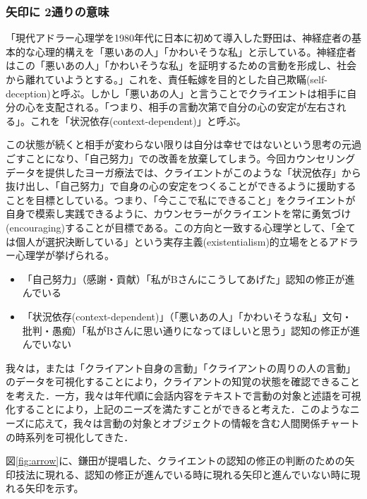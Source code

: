 \documentclass[shuuron]{kuee}
\begin{document}
\subsubsection{矢印に
2通りの意味
}


 「現代アドラー心理学を1980年代に日本に初めて導入した野田\cite{zokad}は、神経症者の基本的な心理的構えを「悪いあの人」「かわいそうな私」と示している。神経症者はこの「悪いあの人」「かわいそうな私」を証明するための言動を形成し、社会から離れていようとする。」これを、責任転嫁を目的とした自己欺瞞(self-deception)と呼ぶ\cite{Darshana}。しかし「悪いあの人」と言うことでクライエントは相手に自分の心を支配される。「つまり、相手の言動次第で自分の心の安定が左右される」。これを「状況依存(context-dependent)」と呼ぶ。

 この状態が続くと相手が変わらない限りは自分は幸せではないという思考の元過ごすことになり、「自己努力」での改善を放棄してしまう。今回カウンセリングデータを提供したヨーガ療法では、クライエントがこのような「状況依存」から抜け出し、「自己努力」で自身の心の安定をつくることができるように援助することを目標としている。つまり、「今ここで私にできること」をクライエントが自身で模索し実践できるように、カウンセラーがクライエントを常に勇気づけ(encouraging)することが目標である。この方向と一致する心理学として、「全ては個人が選択決断している」という実存主義(existentialism)的立場をとるアドラー心理学が挙げられる。

 \begin{itemize}
 \item 「自己努力」（感謝・貢献）「私がBさんにこうしてあげた」認知の修正が進んでいる
\item 「状況依存(context-dependent)」（「悪いあの人」「かわいそうな私」文句・批判・愚痴）「私がBさんに思い通りになってほしいと思う」認知の修正が進んでいない
 \end{itemize}

  我々は，または「クライアント自身の言動」「クライアントの周りの人の言動」のデータを可視化することにより，クライアントの知覚の状態を確認できることを考えた．一方，我々は年代順に会話内容をテキストで言動の対象と述語を可視化することにより，上記のニーズを満たすことができると考えた．このようなニーズに応えて，我々は言動の対象とオブジェクトの情報を含む人間関係チャートの時系列を可視化してきた．

図\ref{fig:arrow}に、鎌田\cite{鎌田穣2002臨床}が提唱した、クライエントの認知の修正の判断のための矢印技法に現れる、認知の修正が進んでいる時に現れる矢印と進んでいない時に現れる矢印を示す。
\end{document}
